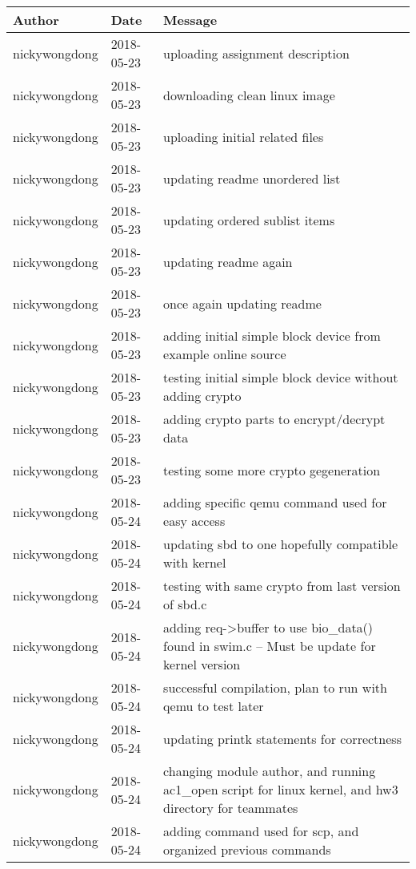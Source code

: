 \documentclass[onecolumn, draftclsnofoot,10pt, compsoc]{IEEEtran}
\begin{document}
\begin{longtable} {|l|l|p{13cm}|}
    \hline
    \textbf{Author} & \textbf{Date} & \textbf{Message} \\ \hline
nickywongdong & 2018-05-23 & uploading assignment description \\ \hline
nickywongdong & 2018-05-23 & downloading clean linux image \\ \hline
nickywongdong & 2018-05-23 & uploading initial related files \\ \hline
nickywongdong & 2018-05-23 & updating readme unordered list \\ \hline
nickywongdong & 2018-05-23 & updating ordered sublist items \\ \hline
nickywongdong & 2018-05-23 & updating readme again \\ \hline
nickywongdong & 2018-05-23 & once again updating readme \\ \hline
nickywongdong & 2018-05-23 & adding initial simple block device from example online source \\ \hline
nickywongdong & 2018-05-23 & testing initial simple block device without adding crypto \\ \hline
nickywongdong & 2018-05-23 & adding crypto parts to encrypt/decrypt data \\ \hline
nickywongdong & 2018-05-23 & testing some more crypto gegeneration \\ \hline
nickywongdong & 2018-05-24 & adding specific qemu command used for easy access \\ \hline
nickywongdong & 2018-05-24 & updating sbd to one hopefully compatible with kernel \\ \hline
nickywongdong & 2018-05-24 & testing with same crypto from last version of sbd.c \\ \hline
nickywongdong & 2018-05-24 & adding req->buffer to use bio\_data() found in swim.c -- Must be update for kernel version \\ \hline
nickywongdong & 2018-05-24 & successful compilation, plan to run with qemu to test later \\ \hline
nickywongdong & 2018-05-24 & updating printk statements for correctness \\ \hline
nickywongdong & 2018-05-24 & changing module author, and running ac1\_open script for linux kernel, and hw3 directory for teammates \\ \hline
nickywongdong & 2018-05-24 & adding command used for scp, and organized previous commands \\ \hline

\end{longtable}
\end{document}
